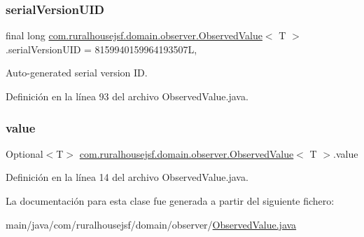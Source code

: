 \subsubsection{\texorpdfstring{serialVersionUID}{serialVersionUID}}
{\footnotesize\ttfamily final long \mbox{\hyperlink{a00180}{com.\+ruralhousejsf.\+domain.\+observer.\+Observed\+Value}}$<$ T $>$.serial\+Version\+U\+ID = 8159940159964193507L\hspace{0.3cm}{\ttfamily [static]}, {\ttfamily [private]}}



Auto-\/generated serial version ID. 



Definición en la línea 93 del archivo Observed\+Value.\+java.

\mbox{\label{a00180_a7f337dfd21158b7642243b5fd1fcb877}} 
\subsubsection{\texorpdfstring{value}{value}}
{\footnotesize\ttfamily Optional$<$T$>$ \mbox{\hyperlink{a00180}{com.\+ruralhousejsf.\+domain.\+observer.\+Observed\+Value}}$<$ T $>$.value\hspace{0.3cm}{\ttfamily [private]}}



Definición en la línea 14 del archivo Observed\+Value.\+java.



La documentación para esta clase fue generada a partir del siguiente fichero\+:\begin{DoxyCompactItemize}
\item 
main/java/com/ruralhousejsf/domain/observer/\mbox{\hyperlink{a00041}{Observed\+Value.\+java}}\end{DoxyCompactItemize}
